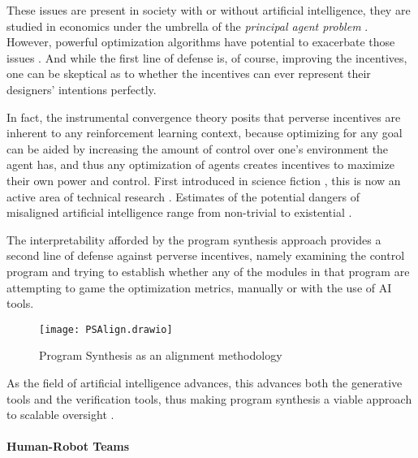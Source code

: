 These issues are present in society \cite{nestianPerverseIncentiveGeneral2017} with or without artificial intelligence, they are studied in economics under the umbrella of the \emph{principal agent problem} \cite{pandaAgencyTheoryReview2017}. 
However, powerful optimization algorithms have potential to exacerbate those issues \cite{hadfield-menellIncompleteContractingAI2019}. 
And while the first line of defense is, of course, improving the incentives, one can be skeptical as to whether the incentives can ever represent their designers' intentions perfectly.

In fact, the instrumental convergence theory \cite{benson-tilsenFormalizingConvergentInstrumental} posits that perverse incentives are inherent to any reinforcement learning context, because optimizing for any goal can be aided by increasing the amount of control over one's environment the agent has, and thus any optimization of agents creates incentives to maximize their own power and control. 
First introduced in science fiction \cite{clarke2001SpaceOdyssey2016, ellisonHaveNoMouth1967, jonesColossus2019}, this is now an active area of technical research \cite{jiAIAlignmentComprehensive2024}.
Estimates of the potential dangers of misaligned artificial intelligence range from non-trivial to existential \cite{mcleanRisksAssociatedArtificial2023}.

The interpretability afforded by the program synthesis approach provides a second line of defense against perverse incentives, namely examining the control program and trying to establish whether any of the modules in that program are attempting to game the optimization metrics, manually or with the use of AI tools.

\begin{figure}[H]
    \centering
    \texttt{[image: PSAlign.drawio]}
    \caption{Program Synthesis as an alignment methodology}
    \label{fig:ps-as-alignment}
\end{figure}

As the field of artificial intelligence advances, this advances both the generative tools and the verification tools, thus making program synthesis a viable approach to scalable oversight \cite[section 5]{amodeiConcreteProblemsAI2016}.

\paragraph{Human-Robot Teams}

